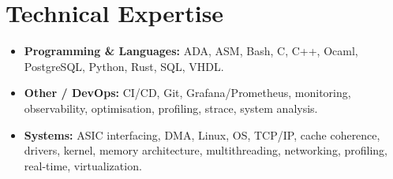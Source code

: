 \documentclass[9pt,a4paper]{article}
\begin{document}
\section*{Technical Expertise}
\begin{tcolorbox}[mybox]
\begin{itemize}
\item \textbf{Programming \& Languages:} ADA, ASM, Bash, C, C++, Ocaml, PostgreSQL, Python, Rust, SQL, VHDL.

\item \textbf{Other / DevOps:} CI/CD, Git, Grafana/Prometheus, monitoring, observability, optimisation, profiling, strace, system analysis.

\item \textbf{Systems:} ASIC interfacing, DMA, Linux, OS, TCP/IP, cache coherence, drivers, kernel, memory architecture, multithreading, networking, profiling, real-time, virtualization.
\end{itemize}
\end{tcolorbox}
\end{document}

